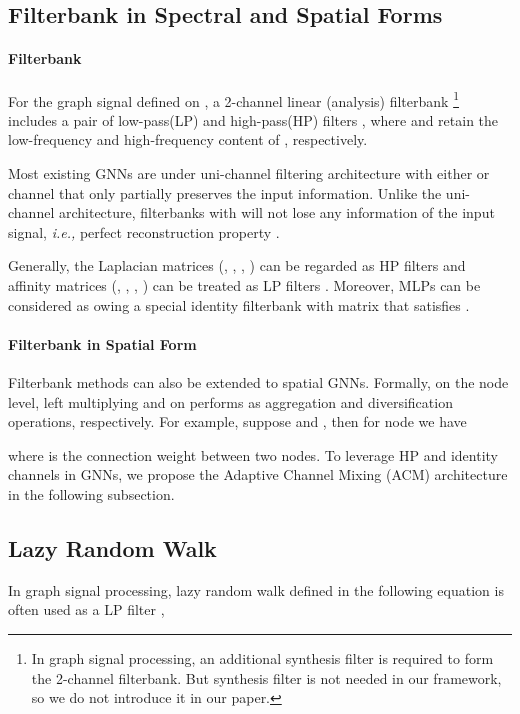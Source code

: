 \documentclass{article}
\newcommand\ie{\textit{i.e.,}}
\newcommand{\0}{{\boldsymbol{0}}}
\newcommand{\6}{{\partial}}
\newcommand{\8}{{\infty}}
\newcommand{\4}{{\nabla}}
\begin{document}
\subsection{Filterbank in Spectral and Spatial Forms}
\label{sec:filterbank_spectral_spatial}
\paragraph{Filterbank} For the graph signal  defined on , a 2-channel linear (analysis) filterbank \cite{ekambaram2014graph} \footnote{In graph signal processing, an additional synthesis filter \cite{ekambaram2014graph} is required to form the 2-channel filterbank. But synthesis filter is not needed in our framework, so we do not introduce it in our paper.} includes a pair of low-pass(LP) and high-pass(HP) filters , where  and  retain the low-frequency and high-frequency content of , respectively.

Most existing GNNs are under uni-channel filtering architecture \cite{kipf2016classification,velivckovic2017attention,hamilton2017inductive} with either  or  channel that only partially preserves the input information. Unlike the uni-channel architecture, filterbanks with  will not lose any information of the input signal, \ie{} perfect reconstruction property \cite{ekambaram2014graph}.

Generally, the Laplacian matrices (, , , ) can be regarded as HP filters \cite{ekambaram2014graph} and affinity matrices (, , , ) can be treated as LP filters \cite{maehara2019revisiting, hamilton2020graph}. Moreover, MLPs can be considered as owing a special identity filterbank with matrix  that satisfies .
\paragraph{Filterbank in Spatial Form}
Filterbank methods can also be extended to spatial GNNs. Formally, on the node level, left multiplying  and  on  performs as aggregation and diversification operations, respectively. For example, suppose  and , then for node  we have
 
where  is the connection weight between two nodes. To leverage HP and identity channels in GNNs, we propose the Adaptive Channel Mixing (ACM) architecture in the following subsection.
\iffalse
\subsection{Lazy Random Walk}
\label{sec:lazy_random_walk}
In graph signal processing, lazy random walk defined in the following equation is often used as a LP filter \cite{ekambaram2014graph},
\end{document}
